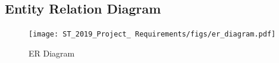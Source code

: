 \documentclass[a4paper]{article}
\newcommand{\arraystrechlength}{1.5}
\begin{document}

\subsection{Entity Relation Diagram}
\begin{figure}[H]
\centering
    \texttt{[image: ST\_2019\_Project\_ Requirements/figs/er\_diagram.pdf]}
    \caption{ER Diagram}
    \label{fig:er-diagram}
\end{figure}
\end{document}
